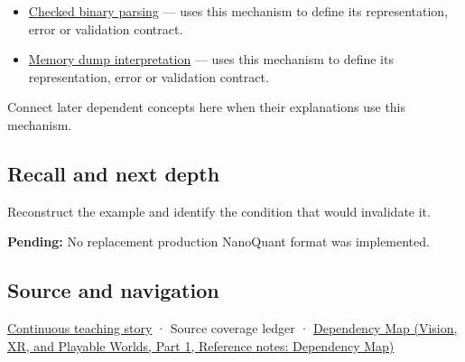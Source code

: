 \hypertarget{appendix-590bbb2424c1-used-by}{}

\begin{itemize}
\tightlist
\item
  \hyperref[appendix-652d81568de9]{Checked binary parsing} --- uses this mechanism to define its representation, error or validation contract.
\item
  \hyperref[appendix-230b59c0676b]{Memory dump interpretation} --- uses this mechanism to define its representation, error or validation contract.
\end{itemize}

Connect later dependent concepts here when their explanations use this mechanism.

\subsection{Recall and next depth}\label{appendix-590bbb2424c1-recall-and-next-depth}

\hypertarget{appendix-590bbb2424c1-recall-and-next-depth}{}

Reconstruct the example and identify the condition that would invalidate it.

\textbf{Pending:} No replacement production NanoQuant format was implemented.

\subsection{Source and navigation}\label{appendix-590bbb2424c1-source-and-navigation}

\hypertarget{appendix-590bbb2424c1-source-and-navigation}{}

\hyperref[01-foundations-i-ch002-bytes-become-a-durable-agreement]{Continuous teaching story} · {Source coverage ledger} · \href{../07-Vision-XR-and-Playable-Worlds-P01/main.pdf\#nameddest=appendix-4ad47bdd269a}{Dependency Map (Vision, XR, and Playable Worlds, Part 1, Reference notes: Dependency Map)}
